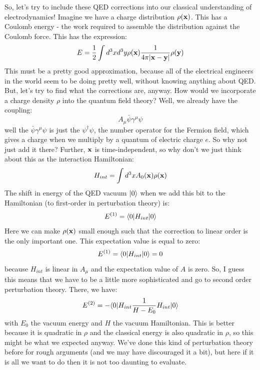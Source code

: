 So, let's try to include these QED corrections into our classical understanding of electrodynamics! Imagine we have a charge distribution $\rho(\mathbf{x})$. This has a Coulomb energy - the work required to assemble the distribution against the Coulomb force. This has the expression:
\begin{equation}
    E = \frac{1}{2}\int d^3x d^3y \rho(\mathbf{x})\frac{1}{4\pi\lvert \mathbf{x} - \mathbf{y} \rvert}\rho(\mathbf{y})
\end{equation}
This must be a pretty good approximation, because all of the electrical engineers in the world seem to be doing pretty well, without knowing anything about QED. But, let's try to find what the corrections are, anyway. How would we incorporate a charge density $\rho$ into the quantum field theory? Well, we already have the coupling:
\begin{equation}
    A_\mu \bar{\psi}\gamma^\mu \psi
\end{equation}
well the $\bar{\psi}\gamma^\mu \psi$ is just the $\psi^\dag \psi$, the number operator for the Fermion field, which gives a charge when we multiply by a quantum of electric charge $e$. So why not just add it there?  Further, $\mathbf{x}$ is time-independent, so why don't we just think about this as the interaction Hamiltonian:
\begin{equation}
    H_{int} = \int d^3x A_0(\mathbf{x})\rho(\mathbf{x})
\end{equation}
The shift in energy of the QED vacuum $\lvert 0 \rangle$ when we add this bit to the Hamiltonian (to first-order in perturbation theory) is:
\begin{equation}
    E^{(1)} = \langle 0 \rvert H_{int}\lvert 0 \rangle
\end{equation}
Here we can make $\rho(\mathbf{x})$ small enough such that the correction to linear order is the only important one. This expectation value is equal to zero:
\begin{equation}
    E^{(1)} = \langle 0 \rvert H_{int}\lvert 0 \rangle = 0
\end{equation}
because $H_{int}$ is linear in $A_\mu$ and the expectation value of $A$ is zero. So, I guess this means that we have to be a little more sophisticated and go to second order perturbation theory. There, we have:
\begin{equation}
    E^{(2)} = -\langle 0 \rvert H_{int}\frac{1}{H - E_0}H_{int}\lvert 0 \rangle
\end{equation}
with $E_0$ the vacuum energy and $H$ the vacuum Hamiltonian.
This is better because it is quadratic in $\rho$ and the classical energy is also quadratic in $\rho$, so this might be what we expected anyway. We've done this kind of perturbation theory before for rough arguments (and we may have discouraged it a bit), but here if it is all we want to do then it is not too daunting to evaluate.

